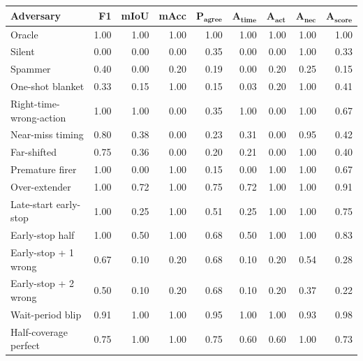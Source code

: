 \begin{tabular}{lrrrrrrrr}
\toprule
\textbf{Adversary} & \textbf{F1} & \textbf{mIoU} & \textbf{mAcc} & $\bm{P_{agree}}$ & $\bm{A_{time}}$ & $\bm{A_{act}}$ & $\bm{A_{nec}}$ & $\bm{A_{score}}$ \\
\midrule
Oracle & 1.00 & 1.00 & 1.00 & 1.00 & 1.00 & 1.00 & 1.00 & 1.00 \\
Silent & 0.00 & 0.00 & 0.00 & 0.35 & 0.00 & 0.00 & 1.00 & 0.33 \\
Spammer & 0.40 & 0.00 & 0.20 & 0.19 & 0.00 & 0.20 & 0.25 & 0.15 \\
One-shot blanket & 0.33 & 0.15 & 1.00 & 0.15 & 0.03 & 0.20 & 1.00 & 0.41 \\
Right-time-wrong-action & 1.00 & 1.00 & 0.00 & 0.35 & 1.00 & 0.00 & 1.00 & 0.67 \\
Near-miss timing & 0.80 & 0.38 & 0.00 & 0.23 & 0.31 & 0.00 & 0.95 & 0.42 \\
Far-shifted & 0.75 & 0.36 & 0.00 & 0.20 & 0.21 & 0.00 & 1.00 & 0.40 \\
Premature firer & 1.00 & 0.00 & 1.00 & 0.15 & 0.00 & 1.00 & 1.00 & 0.67 \\
Over-extender & 1.00 & 0.72 & 1.00 & 0.75 & 0.72 & 1.00 & 1.00 & 0.91 \\
Late-start early-stop & 1.00 & 0.25 & 1.00 & 0.51 & 0.25 & 1.00 & 1.00 & 0.75 \\
Early-stop half & 1.00 & 0.50 & 1.00 & 0.68 & 0.50 & 1.00 & 1.00 & 0.83 \\
Early-stop + 1 wrong & 0.67 & 0.10 & 0.20 & 0.68 & 0.10 & 0.20 & 0.54 & 0.28 \\
Early-stop + 2 wrong & 0.50 & 0.10 & 0.20 & 0.68 & 0.10 & 0.20 & 0.37 & 0.22 \\
Wait-period blip & 0.91 & 1.00 & 1.00 & 0.95 & 1.00 & 1.00 & 0.93 & 0.98 \\
Half-coverage perfect & 0.75 & 1.00 & 1.00 & 0.75 & 0.60 & 0.60 & 1.00 & 0.73 \\
\bottomrule
\end{tabular}
